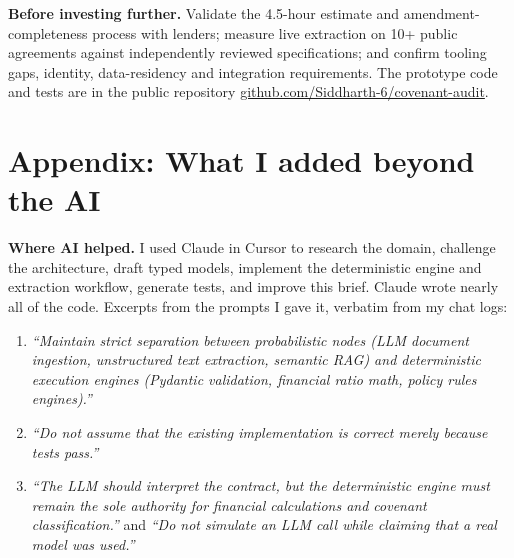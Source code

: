 \documentclass[10pt,letterpaper]{article}
\begin{document}
\textbf{Before investing further.} Validate the 4.5-hour estimate and amendment-completeness process with lenders; measure live extraction on 10+ public agreements against independently reviewed specifications; and confirm tooling gaps, identity, data-residency and integration requirements. The prototype code and tests are in the public repository \href{https://github.com/Siddharth-6/covenant-audit}{github.com/Siddharth-6/covenant-audit}.

\clearpage
\section{Appendix: What I added beyond the AI}
\textbf{Where AI helped.} I used Claude in Cursor to research the domain, challenge the architecture, draft typed models, implement the deterministic engine and extraction workflow, generate tests, and improve this brief. Claude wrote nearly all of the code. Excerpts from the prompts I gave it, verbatim from my chat logs:
\begin{enumerate}[leftmargin=1.5em,itemsep=2pt]
\item \emph{``Maintain strict separation between probabilistic nodes (LLM document ingestion, unstructured text extraction, semantic RAG) and deterministic execution engines (Pydantic validation, financial ratio math, policy rules engines).''}
\item \emph{``Do not assume that the existing implementation is correct merely because tests pass.''}
\item \emph{``The LLM should interpret the contract, but the deterministic engine must remain the sole authority for financial calculations and covenant classification.''} and \emph{``Do not simulate an LLM call while claiming that a real model was used.''}
\end{enumerate}
\end{document}
